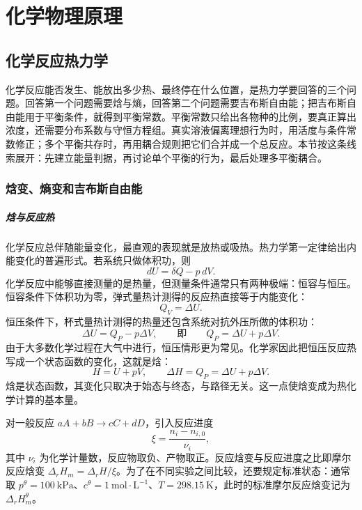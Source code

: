 \documentclass[UTF8]{ctexbook}
\begin{document}
\tableofcontents


\chapter{化学物理原理}

\section{化学反应热力学}

化学反应能否发生、能放出多少热、最终停在什么位置，是热力学要回答的三个问题。回答第一个问题需要焓与熵，回答第二个问题需要吉布斯自由能；把吉布斯自由能用于平衡条件，就得到平衡常数。平衡常数只给出各物种的比例，要真正算出浓度，还需要分布系数与守恒方程组。真实溶液偏离理想行为时，用活度与条件常数修正；多个平衡共存时，再用耦合规则把它们合并成一个总反应。本节按这条线索展开：先建立能量判据，再讨论单个平衡的行为，最后处理多平衡耦合。

\subsection{焓变、熵变和吉布斯自由能}

\paragraph{焓与反应热}

化学反应总伴随能量变化，最直观的表现就是放热或吸热。热力学第一定律给出内能变化的普遍形式。若系统只做体积功，则
\[
dU=\delta Q-p\,dV .
\]
化学反应中能够直接测量的是热量，但测量条件通常只有两种极端：恒容与恒压。恒容条件下体积功为零，弹式量热计测得的反应热直接等于内能变化：
\[
Q_V=\Delta U .
\]
恒压条件下，杯式量热计测得的热量还包含系统对抗外压所做的体积功：
\[
\Delta U=Q_P-p\Delta V,
\qquad\text{即}\qquad
Q_P=\Delta U+p\Delta V .
\]
由于大多数化学过程在大气中进行，恒压情形更为常见。化学家因此把恒压反应热写成一个状态函数的变化，这就是焓：
\[
H=U+pV,
\qquad
\Delta H=Q_P=\Delta U+p\Delta V .
\]
焓是状态函数，其变化只取决于始态与终态，与路径无关。这一点使焓变成为热化学计算的基本量。

对一般反应 \(aA+bB\to cC+dD\)，引入反应进度
\[
\xi=\frac{n_i-n_{i,0}}{\nu_i},
\]
其中 \(\nu_i\) 为化学计量数，反应物取负、产物取正。反应焓变与反应进度之比即摩尔反应焓变 \(\Delta_rH_m=\Delta_rH/\xi\)。为了在不同实验之间比较，还要规定标准状态：通常取 \(p^\theta=100~\mathrm{kPa}\)、\(c^\theta=1~\mathrm{mol\cdot L^{-1}}\)、\(T=298.15~\mathrm{K}\)，此时的标准摩尔反应焓变记为 \(\Delta_rH_m^\theta\)。
\end{document}

